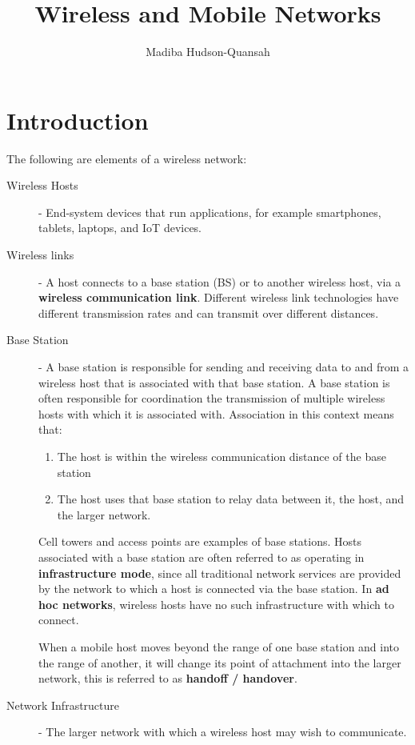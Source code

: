 \documentclass[12pt letter]{report}
\title{\Huge{Wireless and Mobile Networks}}
\author{\huge{Madiba Hudson-Quansah}}
\date{}
\begin{document}
\maketitle
\newpage
{}
\tableofcontents
\pagebreak

\chapter{Introduction}

The following are elements of a wireless network:
\begin{description}
  \item[Wireless Hosts]  - End-system devices that run applications,
    for example smartphones, tablets, laptops, and IoT devices.
  \item[Wireless links] - A host connects to a base station (BS) or
    to another wireless host, via a \textbf{wireless communication
    link}. Different wireless link technologies have different
    transmission rates and can transmit over different distances.
  \item[Base Station] - A base station is responsible for sending and
    receiving data to and from a wireless host that is associated
    with that base station. A base station is often responsible for
    coordination the transmission of multiple wireless hosts with
    which it is associated with. Association in this context means that:
    \begin{enumerate}
      \item The host is within the wireless communication distance of
        the base station
      \item The host uses that base station to relay data between it,
        the host, and the larger network.
    \end{enumerate}
    Cell towers and access points are examples of base stations.
    Hosts associated with a base station are often referred to as
    operating in \textbf{infrastructure mode}, since all traditional
    network services are provided by the network to which a host is
    connected via the base station. In \textbf{ad hoc networks},
    wireless hosts have no such infrastructure with which to connect.

    When a mobile host moves beyond the range of one base station and
    into the range of another, it will change its point of attachment
    into the larger network, this is referred to as \textbf{handoff / handover}.
  \item[Network Infrastructure] - The larger network with which a
    wireless host may wish to communicate.
\end{description}
\end{document}
